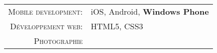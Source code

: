 %
%
%

\begin{tabular}{rl}
    \textsc{Mobile development:} & iOS, Android, \textbf{Windows Phone}\\
    \textsc{Développement web:} & HTML5, CSS3 \\ 
    \textsc{Photographie} & \\
\end{tabular}